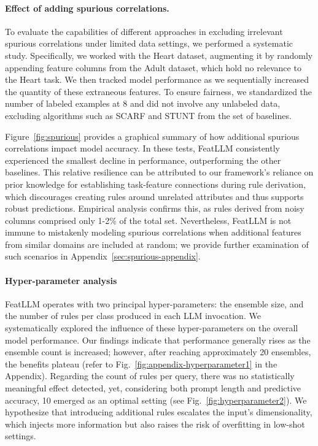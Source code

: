 \vspace*{-0.12in}
\paragraph{Effect of adding spurious correlations.} To evaluate the capabilities of different approaches in excluding irrelevant spurious correlations under limited data settings, we performed a systematic study. Specifically, we worked with the Heart dataset, augmenting it by randomly appending feature columns from the Adult dataset, which hold no relevance to the Heart task. We then tracked model performance as we sequentially increased the quantity of these extraneous features. To ensure fairness, we standardized the number of labeled examples at 8 and did not involve any unlabeled data, excluding algorithms such as SCARF and STUNT from the set of baselines.

Figure~\ref{fig:spurious} provides a graphical summary of how additional spurious correlations impact model accuracy. In these tests, \textsf{FeatLLM} consistently experienced the smallest decline in performance, outperforming the other baselines. This relative resilience can be attributed to our framework’s reliance on prior knowledge for establishing task-feature connections during rule derivation, which discourages creating rules around unrelated attributes and thus supports robust predictions. Empirical analysis confirms this, as rules derived from noisy columns comprised only 1-2\% of the total set. Nevertheless, \textsf{FeatLLM} is not immune to mistakenly modeling spurious correlations when additional features from similar domains are included at random; we provide further examination of such scenarios in Appendix~\ref{sec:spurious-appendix}.

\vspace*{-0.12in}
\paragraph{Hyper-parameter analysis}
\textsf{FeatLLM} operates with two principal hyper-parameters: the ensemble size, and the number of rules per class produced in each LLM invocation. We systematically explored the influence of these hyper-parameters on the overall model performance. Our findings indicate that performance generally rises as the ensemble count is increased; however, after reaching approximately 20 ensembles, the benefits plateau (refer to Fig.~\ref{fig:appendix-hyperparameter1} in the Appendix). Regarding the count of rules per query, there was no statistically meaningful effect detected, yet, considering both prompt length and predictive accuracy, 10 emerged as an optimal setting (see Fig.~\ref{fig:hyperparameter2}). We hypothesize that introducing additional rules escalates the input's dimensionality, which injects more information but also raises the risk of overfitting in low-shot settings.

